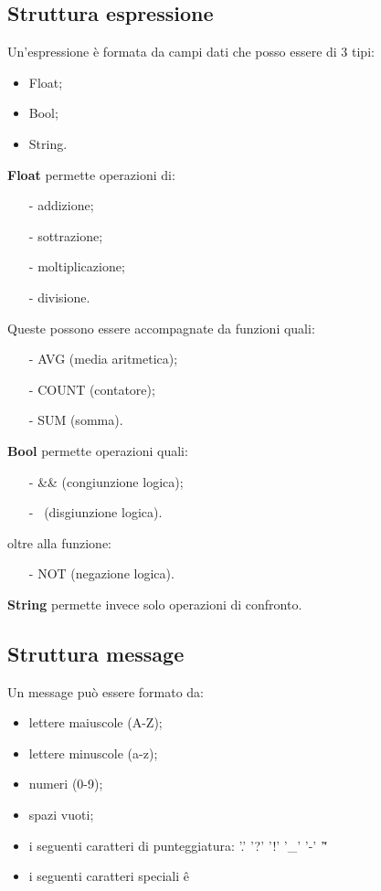 \subsection{Struttura espressione}
Un'espressione \`e formata da campi dati che posso essere di 3 tipi:
\begin{itemize}
\item Float;
\item Bool;
\item String. 
\end{itemize}
\textbf{Float} permette operazioni di:
\begin{itemize}
\item[-] addizione;
\item[-] sottrazione;
\item[-] moltiplicazione;
\item[-] divisione.
\end{itemize}
Queste possono essere accompagnate da funzioni quali:
\begin{itemize}
\item[-] AVG (media aritmetica);
\item[-] COUNT (contatore);
\item[-] SUM (somma). 
\end{itemize}
\textbf{Bool} permette operazioni quali:
\begin{itemize}
\item[-] \&\& (congiunzione logica);
\item[-] \textbar\textbar\ (disgiunzione logica).
\end{itemize}
oltre alla funzione:
\begin{itemize}
\item[-] NOT (negazione logica). 
\end{itemize}
\textbf{String} permette invece solo operazioni di confronto.
\subsection{Struttura message}
Un message pu\`o essere formato da:
\begin{itemize}
\item lettere maiuscole (A-Z);
\item lettere minuscole (a-z);
\item numeri (0-9);
\item spazi vuoti;
\item i seguenti caratteri di punteggiatura: '.'  '?'  '!'  '\_'  '-'  '\~'
\item i seguenti caratteri speciali \^ e \~ \\
\end{itemize}
